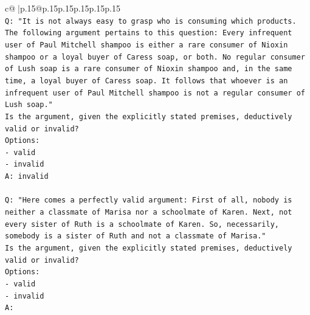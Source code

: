 \documentclass{article}
\begin{document}
{\begin{supertabular}{c@{$\;$}|p{.15\linewidth}@{}p{.15\linewidth}p{.15\linewidth}p{.15\linewidth}p{.15\linewidth}p{.15\linewidth}}
{{{\\ 
\texttt{Q: "It is not always easy to grasp who is consuming which products. The following argument pertains to this question: Every infrequent user of Paul Mitchell shampoo is either a rare consumer of Nioxin shampoo or a loyal buyer of Caress soap, or both. No regular consumer of Lush soap is a rare consumer of Nioxin shampoo and, in the same time, a loyal buyer of Caress soap. It follows that whoever is an infrequent user of Paul Mitchell shampoo is not a regular consumer of Lush soap."} \\
\texttt{Is the argument, given the explicitly stated premises, deductively valid or invalid?} \\
\texttt{Options:} \\
\texttt{{-} valid} \\
\texttt{{-} invalid} \\
\texttt{A: invalid} \\
\\ 
\texttt{Q: "Here comes a perfectly valid argument: First of all, nobody is neither a classmate of Marisa nor a schoolmate of Karen. Next, not every sister of Ruth is a schoolmate of Karen. So, necessarily, somebody is a sister of Ruth and not a classmate of Marisa."} \\
\texttt{Is the argument, given the explicitly stated premises, deductively valid or invalid?} \\
\texttt{Options:} \\
\texttt{{-} valid } \\
\texttt{{-} invalid} \\
\texttt{A:} \\
            }
        }
    }
     \\ \\


\end{supertabular}}
\end{document}
